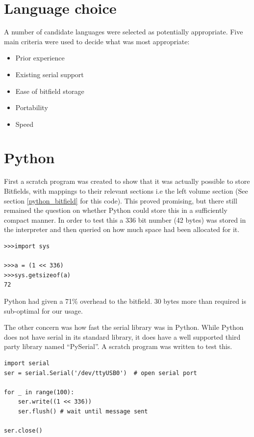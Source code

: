 \section{Language choice}
\label{section:language_choice}

A number of candidate languages were selected as potentially appropriate. Five main criteria were used to decide what was most appropriate: 
\begin{itemize}
    \item Prior experience
    \item Existing serial support
    \item Ease of bitfield storage
    \item Portability
    \item Speed
\end{itemize}

\section*{Python}
First a scratch program was created to show that it was actually possible to store Bitfields, with mappings to their relevant sections i.e the left volume section (See section \ref{python_bitfield} for this code). This proved promising, but there still remained the question on whether Python could store this in a sufficiently compact manner. In order to test this a 336 bit number (42 bytes) was stored in the interpreter and then queried on how much space had been allocated for it. 

\begin{verbatim}
>>>import sys

>>>a = (1 << 336)
>>>sys.getsizeof(a)
72
\end{verbatim}

Python had given a 71\% overhead to the bitfield. 30 bytes more than required is sub-optimal for our usage.

The other concern was how fast the serial library was in Python. While Python does not have serial in its standard library, it does have a well supported third party library named ``PySerial''\cite{pyserial}. A scratch program was written to test this.

\begin{verbatim}
import serial
ser = serial.Serial('/dev/ttyUSB0')  # open serial port

for _ in range(100):
    ser.write((1 << 336))
    ser.flush() # wait until message sent

ser.close()  
\end{verbatim}

